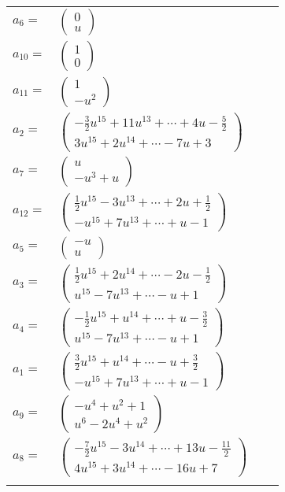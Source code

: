 \documentclass[1p]{elsarticle_modified}
\theoremstyle{definition}
\begin{document}
\begin{tabular}{m{7pt} m{180pt} m{7pt} m{180pt} }
\flushright $a_{6}=$&$\begin{pmatrix}0\\u\end{pmatrix}$ \\
\flushright $a_{10}=$&$\begin{pmatrix}1\\0\end{pmatrix}$ \\
\flushright $a_{11}=$&$\begin{pmatrix}1\\- u^2\end{pmatrix}$ \\
\flushright $a_{2}=$&$\begin{pmatrix}-\frac{3}{2} u^{15}+11 u^{13}+\cdots+4 u-\frac{5}{2}\\3 u^{15}+2 u^{14}+\cdots-7 u+3\end{pmatrix}$ \\
\flushright $a_{7}=$&$\begin{pmatrix}u\\- u^3+u\end{pmatrix}$ \\
\flushright $a_{12}=$&$\begin{pmatrix}\frac{1}{2} u^{15}-3 u^{13}+\cdots+2 u+\frac{1}{2}\\- u^{15}+7 u^{13}+\cdots+u-1\end{pmatrix}$ \\
\flushright $a_{5}=$&$\begin{pmatrix}- u\\u\end{pmatrix}$ \\
\flushright $a_{3}=$&$\begin{pmatrix}\frac{1}{2} u^{15}+2 u^{14}+\cdots-2 u-\frac{1}{2}\\u^{15}-7 u^{13}+\cdots- u+1\end{pmatrix}$ \\
\flushright $a_{4}=$&$\begin{pmatrix}-\frac{1}{2} u^{15}+u^{14}+\cdots+u-\frac{3}{2}\\u^{15}-7 u^{13}+\cdots- u+1\end{pmatrix}$ \\
\flushright $a_{1}=$&$\begin{pmatrix}\frac{3}{2} u^{15}+u^{14}+\cdots- u+\frac{3}{2}\\- u^{15}+7 u^{13}+\cdots+u-1\end{pmatrix}$ \\
\flushright $a_{9}=$&$\begin{pmatrix}- u^4+u^2+1\\u^6-2 u^4+u^2\end{pmatrix}$ \\
\flushright $a_{8}=$&$\begin{pmatrix}-\frac{7}{2} u^{15}-3 u^{14}+\cdots+13 u-\frac{11}{2}\\4 u^{15}+3 u^{14}+\cdots-16 u+7\end{pmatrix}$\\&\end{tabular}
\end{document}
